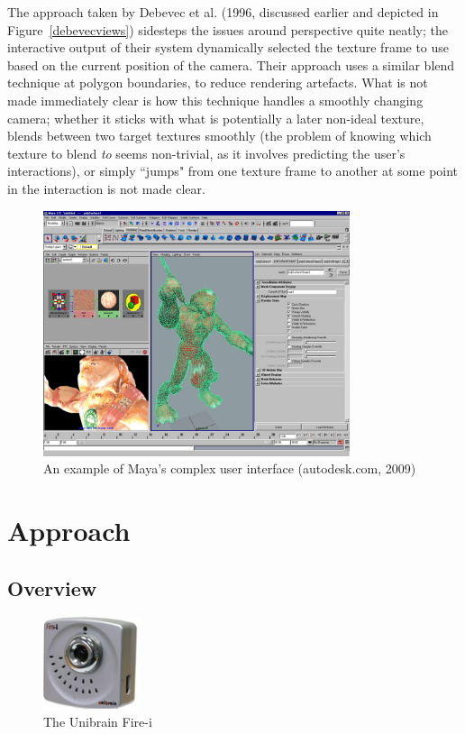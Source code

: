 \documentclass[a4paper,10pt]{article}
\begin{document}
The approach taken by Debevec et al. (1996, discussed earlier and depicted in Figure~\ref{debevecviews}) sidesteps the issues around perspective quite neatly; the interactive output of their system dynamically selected the texture frame to use based on the current position of the camera. Their approach uses a similar blend technique at polygon boundaries, to reduce rendering artefacts. What is not made immediately clear is how this technique handles a smoothly changing camera; whether it sticks with what is potentially a later non-ideal texture, blends between two target textures smoothly (the problem of knowing which texture to blend \textit{to} seems non-trivial, as it involves predicting the user's interactions), or simply ``jumps" from one texture frame to another at some point in the interaction is not made clear.

\clearpage


\begin{figure}
  \begin{center}
    \includegraphics[width=340px]{maya}
  \end{center}
  \caption[An example of Maya's complex user interface]{An example of Maya's complex user interface (autodesk.com, 2009)}
  \label{maya}
\end{figure}
\section{Approach}
\subsection{Overview}

\begin{figure}
  \vspace{-20pt}
  \begin{center}
    \includegraphics[width=80pt]{firei}
  \end{center}
  \caption{The Unibrain Fire-i\texttrademark}
  \label{firei}
\end{figure}
\end{document}

